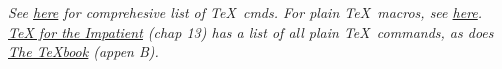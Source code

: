 \documentclass[10pt,landscape]{article}
\begin{document}
\small
\begin{multicols*}{4}

\textsl{See \href{https://www.tug.org/utilities/plain/cseq.html}{here} for comprehesive list of  \TeX\ cmds. For plain \TeX\ macros, see \href{https://www.tutorialspoint.com/tex_commands/}{here}. \href{http://mirrors.ctan.org/info/impatient/book.pdf}{\ul{TeX for the Impatient}} (chap 13) has a list of all plain \TeX\ commands, as does \href{https://ctan.org/pkg/texbook}{\ul{The \TeX book}} (appen B).}\\




%


%
%
%



\vfill\,

\end{multicols*}
\end{document}
